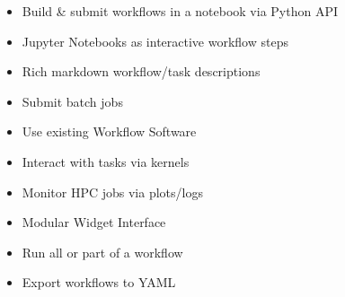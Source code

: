 \documentclass{tikzposter}
\providecommand{\tightlist}{%
  \setlength{\itemsep}{0pt}\setlength{\parskip}{0pt}}
\begin{document}
\begin{columns}
% 
% 
% 
% 
% 
% 
% 
% 

 {
\begin{multicols}{2}
\begin{itemize}
    \item  Build \& submit workflows in a notebook via Python API
    \item  Jupyter Notebooks as interactive workflow steps
    \item  Rich markdown workflow/task descriptions
    \item  Submit batch jobs
    \item  Use existing Workflow Software
    \item  Interact with tasks via kernels
    \item  Monitor HPC jobs via plots/logs
    \item  Modular Widget Interface
    \item  Run all or part of a workflow
    \item  Export workflows to YAML
\end{itemize}
\end{multicols}
}


\end{columns}
\end{document}
